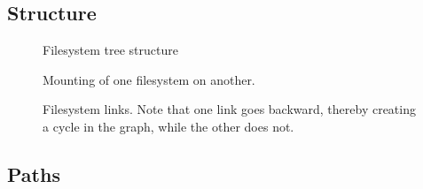 
\subsection{Structure}


\begin{figure}[tbp]
  \begin{center}
  \end{center}
  \caption{Filesystem tree structure}
  \label{fig:topics:fs:dir}
\end{figure}


\begin{figure}[tbp]
  \begin{center}
  \end{center}
  \caption{Mounting of one filesystem on another.}
  \label{fig:topics:fs:mount}
\end{figure}


\begin{figure}[tbp]
  \begin{center}
  \end{center}
  \caption[Filesystem links]{Filesystem links. Note that one link goes backward, thereby creating a cycle in the graph, while the other does not.}
  \label{fig:topics:fs:links}
\end{figure}

\subsection{Paths}


